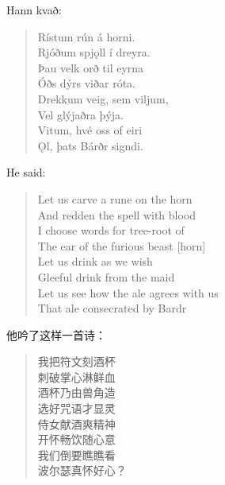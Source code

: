 \begin{paracol}{2}
    Hann kvað:
    \begin{quote}
        Rístum rún á horni.\\
        Rjóðum spjǫll í dreyra.\\
        Þau velk orð til eyrna\\
        Óðs dýrs viðar róta.\\
        Drekkum veig, sem viljum,\\
        Vel glýjaðra þýja.\\
        Vitum, hvé oss of eiri\\
        \MakeUppercase ǫl, þats Bárðr signdi.
    \end{quote}

    \switchcolumn
    He said:
    \begin{quote}
        Let us carve a rune on the horn\\
        And redden the spell with blood\\
        I choose words for tree-root of\\
        The ear of the furious beast [horn]\\
        Let us drink as we wish\\
        Gleeful drink from the maid\\
        Let us see how the ale agrees with us\\
        That ale consecrated by Bardr
    \end{quote}

\end{paracol}
\begin{translation*}{}
    他吟了这样一首诗：
    \begin{quote}
        我把符文刻酒杯\\
        刺破掌心淋鲜血\\
        酒杯乃由兽角造\\
        选好咒语才显灵\\
        侍女献酒爽精神\\
        开怀畅饮随心意\\
        我们倒要瞧瞧看\\
        波尔瑟真怀好心？\\
    \end{quote}
\end{translation*}
